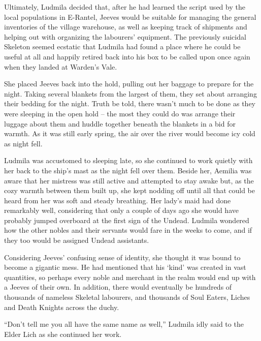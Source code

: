  

Ultimately, Ludmila decided that, after he had learned the script used by the local populations in E-Rantel, Jeeves would be suitable for managing the general inventories of the village warehouse, as well as keeping track of shipments and helping out with organizing the labourers’ equipment. The previously suicidal Skeleton seemed ecstatic that Ludmila had found a place where he could be useful at all and happily retired back into his box to be called upon once again when they landed at Warden’s Vale.

 

She placed Jeeves back into the hold, pulling out her baggage to prepare for the night. Taking several blankets from the largest of them, they set about arranging their bedding for the night. Truth be told, there wasn’t much to be done as they were sleeping in the open hold – the most they could do was arrange their luggage about them and huddle together beneath the blankets in a bid for warmth. As it was still early spring, the air over the river would become icy cold as night fell.

 

Ludmila was accustomed to sleeping late, so she continued to work quietly with her back to the ship’s mast as the night fell over them. Beside her, Aemilia was aware that her mistress was still active and attempted to stay awake but, as the cozy warmth between them built up, she kept nodding off until all that could be heard from her was soft and steady breathing. Her lady’s maid had done remarkably well, considering that only a couple of days ago she would have probably jumped overboard at the first sign of the Undead. Ludmila wondered how the other nobles and their servants would fare in the weeks to come, and if they too would be assigned Undead assistants.

 

Considering Jeeves’ confusing sense of identity, she thought it was bound to become a gigantic mess. He had mentioned that his ‘kind’ was created in vast quantities, so perhaps every noble and merchant in the realm would end up with a Jeeves of their own. In addition, there would eventually be hundreds of thousands of nameless Skeletal labourers, and thousands of Soul Eaters, Liches and Death Knights across the duchy.

 

“Don’t tell me you all have the same name as well,” Ludmila idly said to the Elder Lich as she continued her work.

